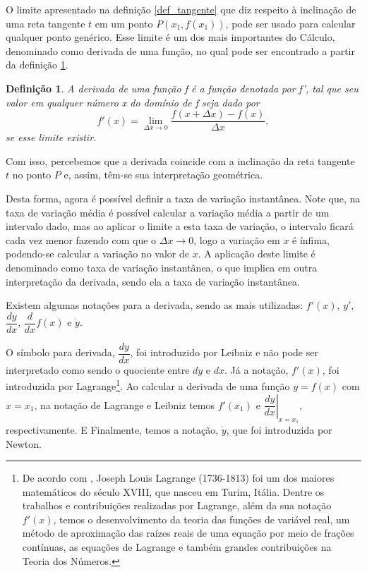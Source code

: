 \documentclass[
	12pt,				%
	openright,			%
    twoside,			%
	a4paper,			%
	chapter=TITLE,		%
	english,			%
	french,				%
	spanish,			%
	brazil				%
	]{abntex2}
\newtheorem{definicao}{Definição}
\numberwithin{lema}{chapter}
\numberwithin{teorema}{chapter}
\numberwithin{definicao}{chapter}
\numberwithin{exemplo}{chapter}
\numberwithin{figure}{chapter}
\begin{document}
O limite apresentado na definição \ref{def_tangente} que diz respeito à inclinação de uma reta tangente $t$ em um ponto $P(x_1, f(x_1))$, pode ser usado para calcular qualquer ponto genérico. Esse limite é um dos mais importantes do Cálculo, denominado como derivada de uma função, no qual pode ser encontrado a partir da definição \ref{def_derivada}.

\begin{definicao}
	\label{def_derivada}
	\cite{leithold} A derivada de uma função f é a função denotada por f', tal que seu valor em qualquer número x do domínio de f seja dado por	
	$$ f'(x) = \lim_{\Delta x\rightarrow 0} \frac{f(x + \Delta x) - f(x)}{\Delta x}, $$
	se esse limite existir.
\end{definicao}

Com isso, percebemos que a derivada coincide com a inclinação da reta tangente $t$ no ponto $P$ e, assim, têm-se sua interpretação geométrica. 

Desta forma, agora é possível definir a taxa de variação instantânea. Note que, na taxa de variação média é possível calcular a variação média a partir de um intervalo dado, mas ao aplicar o limite a esta taxa de variação, o intervalo ficará cada vez menor fazendo com que o $\Delta x \rightarrow 0$, logo a variação em $x$ é ínfima, podendo-se calcular a variação no valor de $x$. A aplicação deste limite é denominado como taxa de variação instantânea, o que implica em outra interpretação da derivada, sendo ela a taxa de variação instantânea.

Existem algumas notações para a derivada, sendo as mais utilizadas: $f'(x)$, $y'$, $\dfrac{dy}{dx}$, $\dfrac{d}{dx}f(x)$ e $\dot{y}$.

O símbolo para derivada, $\dfrac{dy}{dx}$, foi introduzido por Leibniz e não pode ser interpretado como sendo o quociente entre $dy$ e $dx$. Já a notação, $f'(x)$, foi introduzida por Lagrange\footnote{De acordo com , Joseph Louis Lagrange (1736-1813) foi um dos maiores matemáticos do século XVIII, que nasceu em Turim, Itália. Dentre os trabalhos e contribuições realizadas por Lagrange, além da sua notação $f'(x)$, temos o desenvolvimento da teoria das funções de variável real, um método de aproximação das raízes reais de uma equação por meio de frações contínuas, as equações de Lagrange e também grandes contribuições na Teoria dos Números.}. Ao calcular a derivada de uma função $y = f(x)$ com $x = x_1$, na notação de Lagrange e Leibniz temos $f'(x_1)$ e $\left. \dfrac{dy}{dx}\right| _{x = x_1}$, respectivamente. E Finalmente, temos a notação, $\dot{y}$, que foi introduzida por Newton.
\end{document}
